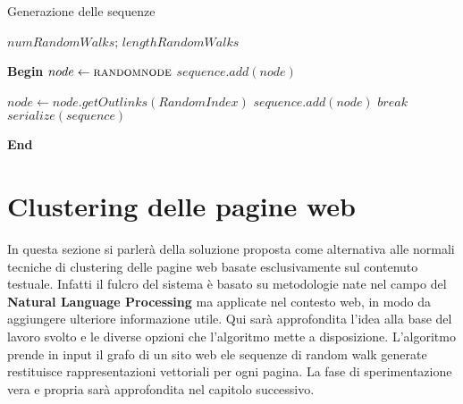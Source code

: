 \begin{algorithm}[H]
\caption{Generazione delle sequenze}
\begin{algorithmic}

	\State $numRandomWalks$;	
	\State $lengthRandomWalks$ 
 	
 	\vspace*{+0.5cm}
 	
	\State \textbf{Begin}
	\State $node \gets \Call{randomnode}{}$
		\State $sequence.add(node)$
		
				\State $node \gets node.getOutlinks(RandomIndex)$
				\State $sequence.add(node)$
			\Else
				\State $break$
			\EndIf
		\EndWhile
		\State $serialize(sequence)$
		
	\EndFor
	\State \textbf{End}
\end{algorithmic}
\end{algorithm}

\section{Clustering delle pagine web}
In questa sezione si parlerà della soluzione proposta come alternativa alle normali tecniche di clustering delle pagine web basate esclusivamente sul contenuto testuale. Infatti il fulcro del sistema è basato su metodologie nate nel campo del \textbf{Natural Language Processing} ma applicate nel contesto web, in modo da aggiungere ulteriore informazione utile. Qui sarà approfondita l'idea alla base del lavoro svolto e le diverse opzioni che l'algoritmo mette a disposizione. 
L'algoritmo prende in input il grafo di un sito web ele sequenze di random walk generate restituisce rappresentazioni vettoriali per ogni pagina.
La fase di sperimentazione vera e propria sarà approfondita nel capitolo successivo.

